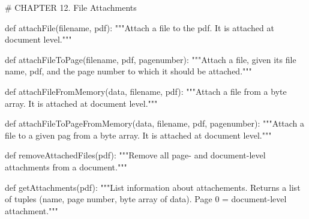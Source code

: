 # CHAPTER 12. File Attachments

def attachFile(filename, pdf):
    """Attach a file to the pdf. It is attached at document level."""

def attachFileToPage(filename, pdf, pagenumber):
    """Attach a file, given its file name, pdf, and the page number to which
    it should be attached."""

def attachFileFromMemory(data, filename, pdf):
    """Attach a file from a byte array. It is attached at document level."""

def attachFileToPageFromMemory(data, filename, pdf, pagenumber):
    """Attach a file to a given pag from a byte array. It is attached at
    document level."""

def removeAttachedFiles(pdf):
    """Remove all page- and document-level attachments from a document."""

def getAttachments(pdf):
    """List information about attachements. Returns a list of tuples
    (name, page number, byte array of data). Page 0 = document-level
    attachment."""
